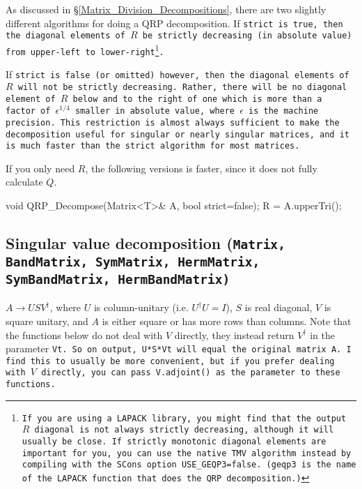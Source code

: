 As discussed in \S\ref{Matrix_Division_Decompositions}, 
there are two slightly different algorithms for doing a QRP decomposition.  
If \tt{strict} is \tt{true}, then the diagonal elements
of $R$ be strictly decreasing (in absolute value) from upper-left to lower-right\footnote{
If you are using a LAPACK library, you might find that the output $R$ diagonal
is not always strictly decreasing, although it will usually be close.  If strictly monotonic
diagonal elements are important for you, you can use the native TMV algorithm instead
by compiling with the SCons option \tt{USE\_GEQP3=false}. (\tt{geqp3} is the name of the LAPACK 
function that does the QRP decomposition.)}.

If \tt{strict} is \tt{false} (or omitted) however, then the diagonal elements of $R$ will not
be strictly decreasing.  Rather, there will be no diagonal element
of $R$ below and to the right of one which is more than a factor of $\epsilon^{1/4}$ 
smaller in absolute value, where 
$\epsilon$ is the machine precision.  This restriction
is almost always sufficient to make the decomposition useful for singular or nearly
singular matrices, and it is much faster than the strict algorithm for most matrices.

If you only need $R$, the following versions is faster, since it does
not fully calculate $Q$.
\begin{tmvcode}
void QRP_Decompose(Matrix<T>& A, bool strict=false);
R = A.upperTri();
\end{tmvcode}

\subsection[Singular value decomposition] {Singular value decomposition \rm (\tt{Matrix}, \tt{BandMatrix}, \tt{SymMatrix}, \tt{HermMatrix},\\ \tt{SymBandMatrix}, \tt{HermBandMatrix})}

$A \rightarrow U S V^\dagger$,
where $U$ is column-unitary (i.e. $U^\dagger U = I$),
$S$ is real diagonal, $V$ is square unitary, and $A$ is either square or 
has more rows than columns.
Note that the functions below do not deal with $V$ directly, they instead return $V^\dagger$
in the parameter \tt{Vt}.  So on output, \tt{U*S*Vt} will equal the original matrix \tt{A}.  I find this to usually be more convenient, but if you prefer dealing with $V$ directly, you can pass
\tt{V.adjoint()} as the parameter to these functions.

